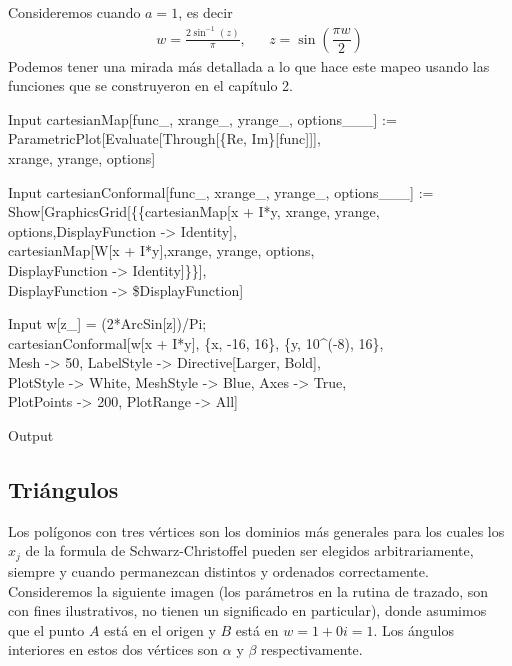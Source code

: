 	
		Consideremos cuando $a=1$, es decir
		\[
			\begin{array}{lcr}
				w=\frac{2\sin^{-1}(z)}{\pi},&&z=\sin\left(\dfrac{\pi w}{2}\right)
			\end{array}
		\]
		Podemos tener una mirada más detallada a lo que hace este mapeo usando las funciones que se construyeron en el capítulo 2.
		
		\begin{mmaCell}{Input}
  cartesianMap[func_, xrange_, yrange_, options___] := \\ParametricPlot[Evaluate[Through[\{Re, Im\}[func]]],\\xrange, yrange, options]
		\end{mmaCell}
	
	\newpage
		\begin{mmaCell}{Input}
  cartesianConformal[func_, xrange_, yrange_, options___] :=\\Show[GraphicsGrid[\{\{cartesianMap[x + I*y, xrange, yrange,\\options,DisplayFunction -> Identity],\\cartesianMap[W[x + I*y],xrange, yrange, options,\\DisplayFunction -> Identity]\}\}],\\DisplayFunction -> \$DisplayFunction]
		\end{mmaCell}
		
		
		\begin{mmaCell}{Input}
  w[z_] = (2*ArcSin[z])/Pi;\\cartesianConformal[w[x + I*y], \{x, -16, 16\}, \{y, 10^(-8), 16\},\\Mesh -> 50, LabelStyle -> Directive[Larger, Bold],\\PlotStyle -> White, MeshStyle -> Blue, Axes -> True,\\PlotPoints -> 200, PlotRange -> All]
		\end{mmaCell}
		\begin{mmaCell}[moregraphics={moreig={scale=0.7}}]{Output}
		\end{mmaCell}
	
	\subsection{Triángulos}
		
	Los polígonos con tres vértices son los dominios más generales para los cuales los $x_j$ de la formula de  Schwarz-Christoffel pueden ser elegidos arbitrariamente, siempre y cuando permanezcan distintos y ordenados correctamente. Consideremos la siguiente imagen (los parámetros en la rutina de trazado, son con fines ilustrativos, no tienen un  significado en particular), donde asumimos que el punto $A$ está en el origen y $B$ está en $w =1+0i=1$. Los ángulos interiores en estos dos vértices son $\alpha$ y $\beta$ respectivamente.
	
